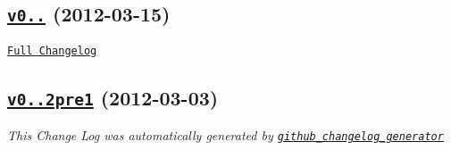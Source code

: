 \subsection*{\href{https://github.com/shelljs/shelljs/tree/v0.0.2}{\tt v0..} (2012-\/03-\/15)}

\href{https://github.com/shelljs/shelljs/compare/v0.0.2pre1...v0.0.2}{\tt Full Changelog}

\subsection*{\href{https://github.com/shelljs/shelljs/tree/v0.0.2pre1}{\tt v0..\+2pre1} (2012-\/03-\/03)}


\begin{DoxyItemize}
\item {\itshape This Change Log was automatically generated by \href{https://github.com/skywinder/Github-Changelog-Generator}{\tt github\+\_\+changelog\+\_\+generator}} 
\end{DoxyItemize}